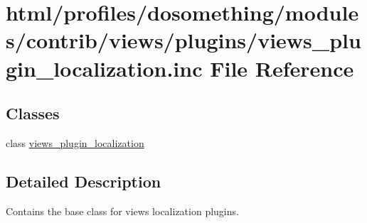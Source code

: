 \hypertarget{views__plugin__localization_8inc}{
\section{html/profiles/dosomething/modules/contrib/views/plugins/views\_\-plugin\_\-localization.inc File Reference}
\label{views__plugin__localization_8inc}
}
\subsection*{Classes}
\begin{DoxyCompactItemize}
\item 
class \hyperlink{classviews__plugin__localization}{views\_\-plugin\_\-localization}
\end{DoxyCompactItemize}


\subsection{Detailed Description}
Contains the base class for views localization plugins. 